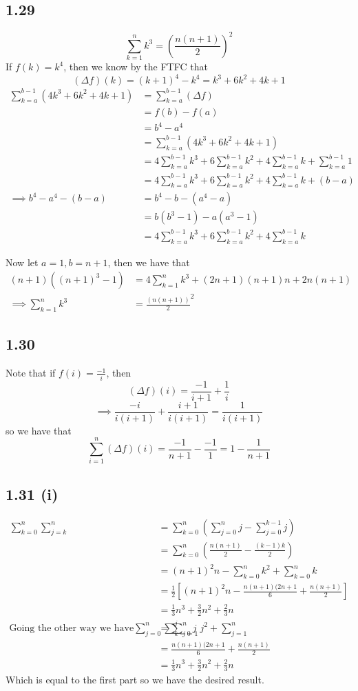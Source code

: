 \documentclass[letterpaper,12pt]{article}
\theoremstyle{definition}
\begin{document}
\subsection*{1.29}
\[ \sum^{n}_{k=1} k^3 = (\frac{n(n+1)}{2})^2\]
If $f(k) = k^4$, then we know by the FTFC that 
\[( \Delta f)(k) = (k+1)^4 - k^4 = k^3 + 6k^2 + 4k +1\]
\begin{align*}
\sum^{b-1}_{k =a} (4k^3 + 6k^2 + 4k + 1) &= \sum^{b-1}_{k = a} (\Delta f) 
\\&=  f(b) -f(a) 
\\&= b^4- a^4
\\&=  \sum^{b-1}_{k=a} (4k^3 + 6k^2 + 4k + 1)
\\&= 4 \sum^{b-1}_{k = a} k^3 + 6 \sum^{b-1}_{k =a} k^2 + 4 \sum^{b-1}_{k=a} k + \sum^{b-1}_{k=a} 1
\\&= 4 \sum^{b-1}_{k = a} k^3 + 6 \sum^{b-1}_{k =a} k^2 + 4 \sum^{b-1}_{k=a} k + (b-a)
\\\implies b^4 - a^4 - (b-a) &= b^4 - b - (a^4 -a) 
\\&= b(b^3-1) - a(a^3 - 1)
\\&= 4 \sum^{b-1}_{k = a} k^3+6 \sum^{b-1}_{k = a} k^2+4 \sum^{b-1}_{k = a} k
\end{align*}

Now let $a=1, b = n+1$, then we have that
\begin{align*}
(n+1)( ( n+1)^3 -1) &= 4 \sum^{n}_{k=1} k^3 + (2n+1)(n+1)n + 2n(n+1)
\\\implies \sum^{n}_{k=1} k^3&= \frac{(n(n+1))}{2}^2
\end{align*}


\subsection*{1.30}
Note that if $f(i) = \frac{-1}{i}$, then 
\[ (\Delta f)(i) = \frac{-1}{i + 1} + \frac{1}{i}\]
\[ \implies \frac{-i}{i(i+1)} + \frac{i+ 1}{i(i+1)} = \frac{1}{i(i+1)}\]
so we have that
\[ \sum^{n}_{i=1} (\Delta f) (i) = \frac{-1}{n+1} - \frac{-1}{1} = 1 - \frac{1}{n+1}\]

\subsection*{1.31 (i)}
\begin{align*}
\sum^{n}_{k=0} \sum^{n}_{j=k} &= \sum^{n}_{k=0} ( \sum^{n}_{j = 0} j - \sum^{k-1}_{j = 0} j)
\\&= \sum^{n}_{k = 0} (\frac{n(n+1)}{2} - \frac{(k-1)k}{2})
\\&= (n+1)^2n - \sum^{n}_{k=0} k^2 + \sum^{n}_{k=0} k
\\&= \frac{1}{2}[(n+1)^2n - \frac{n(n+1)(2n+1}{6} + \frac{n(n+1)}{2}]
\\&= \frac{1}{3}n^3 + \frac{3}{2}n^2 + \frac{2}{3}n
\\
\text{Going the other way we have}
\sum^{n}_{j=0 } \sum^{j}_{k = 0} j &= \sum^{n}_{j=1} j^2 + \sum^{n}_{j=1}  
\\&= \frac{n(n+1)(2n+1}{6} + \frac{n(n+1)}{2}
\\&= \frac{1}{3}n^3 + \frac{3}{2}n^2 + \frac{2}{3}n
\end{align*}
Which is equal to the first part so we have the desired result.
\end{document}
